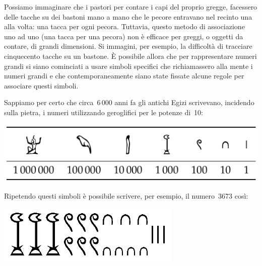 Possiamo immaginare che i pastori per contare i capi del proprio gregge, 
facessero delle tacche su dei bastoni mano a mano che le pecore entravano 
nel recinto una alla volta: una tacca per ogni pecora. 
Tuttavia, questo metodo di associazione uno ad uno (una tacca per una 
pecora) non è efficace per greggi, o oggetti da contare, di grandi 
dimensioni. 
Si immagini, per esempio, la difficoltà di tracciare cinquecento tacche su 
un bastone. 
È possibile allora che per rappresentare numeri grandi si siano cominciati 
a usare simboli specifici che richiamassero alla mente i numeri grandi e 
che contemporaneamente siano state fissate alcune regole per associare 
questi simboli.

Sappiamo per certo che circa~6\,000 anni fa gli antichi Egizi scrivevano, 
incidendo sulla pietra, i numeri utilizzando geroglifici per le potenze 
di~10:

% 
\begin{inaccessibleblock}
\vspace{-2ex}
\begin{center} 
\includegraphics[scale=0.28]{img/hieropotdieci.png} 
\end{center}
\vspace{-2ex}
\end{inaccessibleblock}
                                                                  
Ripetendo questi simboli è possibile scrivere, per esempio, il numero~3673 
così:

\begin{inaccessibleblock}
\vspace{-2ex}
\begin{center} \includegraphics[scale=0.25]{img/hiero3673.png} \end{center}
\vspace{-2ex}
\end{inaccessibleblock}

